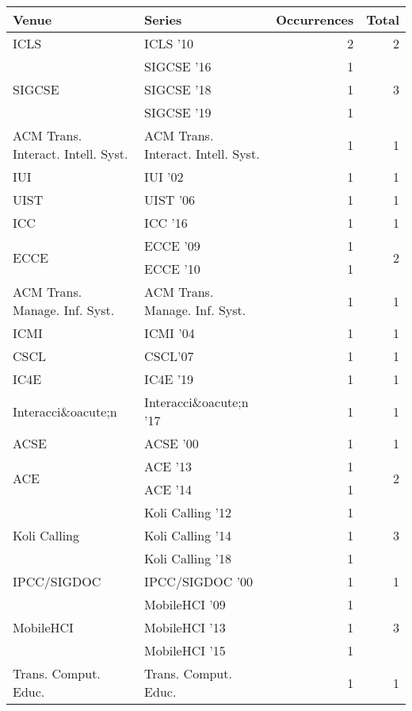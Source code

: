 \begin{table*}[t]
\begin{tabular}{llrr}
Venue & Series & Occurrences & Total\\\hline
\multirow{1}{*}{ICLS } & ICLS '10 & 2 & \multirow{1}{*}{2}\\
\multirow{3}{*}{SIGCSE } & SIGCSE '16 & 1 & \multirow{3}{*}{3}\\
& SIGCSE '18 & 1 &\\
& SIGCSE '19 & 1 &\\
\multirow{1}{*}{ACM Trans. Interact. Intell. Syst.} & ACM Trans. Interact. Intell. Syst. & 1 & \multirow{1}{*}{1}\\
\multirow{1}{*}{IUI } & IUI '02 & 1 & \multirow{1}{*}{1}\\
\multirow{1}{*}{UIST } & UIST '06 & 1 & \multirow{1}{*}{1}\\
\multirow{1}{*}{ICC } & ICC '16 & 1 & \multirow{1}{*}{1}\\
\multirow{2}{*}{ECCE } & ECCE '09 & 1 & \multirow{2}{*}{2}\\
& ECCE '10 & 1 &\\
\multirow{1}{*}{ACM Trans. Manage. Inf. Syst.} & ACM Trans. Manage. Inf. Syst. & 1 & \multirow{1}{*}{1}\\
\multirow{1}{*}{ICMI } & ICMI '04 & 1 & \multirow{1}{*}{1}\\
\multirow{1}{*}{CSCL} & CSCL'07 & 1 & \multirow{1}{*}{1}\\
\multirow{1}{*}{IC4E } & IC4E '19 & 1 & \multirow{1}{*}{1}\\
\multirow{1}{*}{Interacci\&oacute;n } & Interacci\&oacute;n '17 & 1 & \multirow{1}{*}{1}\\
\multirow{1}{*}{ACSE } & ACSE '00 & 1 & \multirow{1}{*}{1}\\
\multirow{2}{*}{ACE } & ACE '13 & 1 & \multirow{2}{*}{2}\\
& ACE '14 & 1 &\\
\multirow{3}{*}{Koli Calling } & Koli Calling '12 & 1 & \multirow{3}{*}{3}\\
& Koli Calling '14 & 1 &\\
& Koli Calling '18 & 1 &\\
\multirow{1}{*}{IPCC/SIGDOC } & IPCC/SIGDOC '00 & 1 & \multirow{1}{*}{1}\\
\multirow{3}{*}{MobileHCI } & MobileHCI '09 & 1 & \multirow{3}{*}{3}\\
& MobileHCI '13 & 1 &\\
& MobileHCI '15 & 1 &\\
\multirow{1}{*}{Trans. Comput. Educ.} & Trans. Comput. Educ. & 1 & \multirow{1}{*}{1}\\

\end{tabular}
\end{table*}
